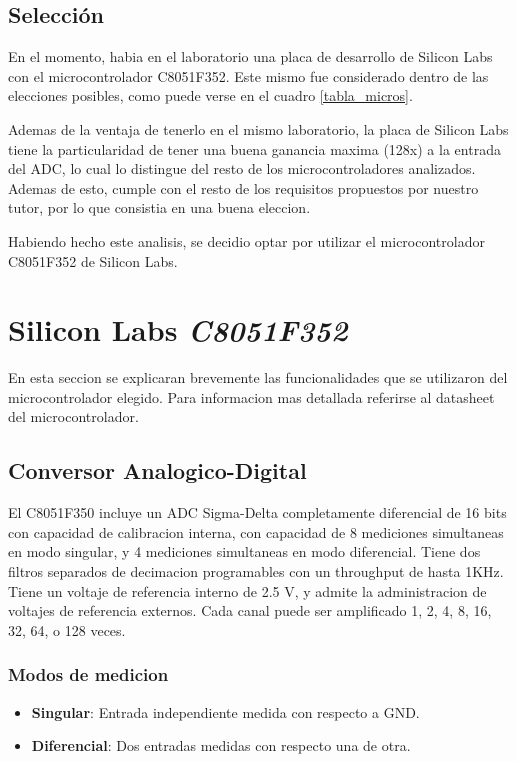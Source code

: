 \documentclass{article}
\theoremstyle{definition}
\theoremstyle{remark}
\begin{document}
\subsection{Selección}
En el momento, habia en el laboratorio una placa de desarrollo de Silicon Labs con el microcontrolador C8051F352. Este mismo fue considerado dentro de las elecciones posibles, como puede verse en el cuadro \ref{tabla_micros}.

Ademas de la ventaja de tenerlo en el mismo laboratorio, la placa de Silicon Labs tiene la particularidad de tener una buena ganancia maxima (128x) a la entrada del ADC, lo cual lo distingue del resto de los microcontroladores analizados. Ademas de esto, cumple con el resto de los requisitos propuestos por nuestro tutor, por lo que consistia en una buena eleccion.

Habiendo hecho este analisis, se decidio optar por utilizar el microcontrolador C8051F352 de Silicon Labs.






\section{Silicon Labs \emph{C8051F352}}
En esta seccion se explicaran brevemente las funcionalidades que se utilizaron del microcontrolador elegido. Para informacion mas detallada referirse al datasheet del microcontrolador. \cite{bib:datasheet}

\subsection{Conversor Analogico-Digital}\label{sec:adc}
El C8051F350 incluye un ADC Sigma-Delta completamente diferencial de 16 bits con capacidad de calibracion interna, con capacidad de 8 mediciones simultaneas en modo singular, y 4 mediciones simultaneas en modo diferencial. Tiene dos filtros separados de decimacion programables con un throughput de hasta 1KHz. Tiene un voltaje de referencia interno de 2.5 V, y admite la administracion de voltajes de referencia externos. Cada canal puede ser amplificado 1, 2, 4, 8, 16, 32, 64, o 128 veces.

\subsubsection{Modos de medicion}
\begin{itemize}
  \item \textbf{Singular}: Entrada independiente medida con respecto a GND.
  \item \textbf{Diferencial}: Dos entradas medidas con respecto una de otra.
\end{itemize}
\end{document}
